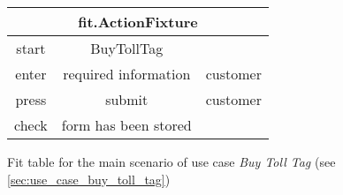 \begin{figure}[H]
\begin{centering}
\begin{tabular}{|c|c|c|}
\hline 
\multicolumn{3}{|c|}{fit.ActionFixture} \tabularnewline\hline 
start & BuyTollTag & \tabularnewline
\hline 
enter & required information & customer\tabularnewline
\hline 
press & submit & customer \tabularnewline
\hline 
check & form has been stored & \tabularnewline
\hline 
\end{tabular}
\caption{Fit table for the main scenario of use case \emph{Buy Toll Tag} (see \autoref{sec:use_case_buy_toll_tag})}
\end{centering}
\end{figure}
